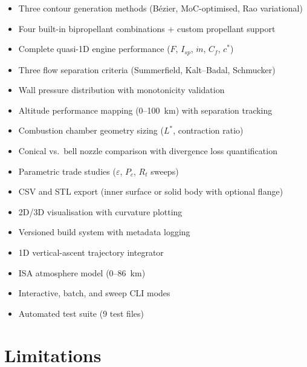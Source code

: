 \documentclass[11pt,a4paper]{article}
\begin{document}
\begin{itemize}[nosep]
\item Three contour generation methods (B\'ezier, MoC-optimised, Rao variational)
\item Four built-in bipropellant combinations + custom propellant support
\item Complete quasi-1D engine performance ($F$, $I_{sp}$, $\dot{m}$, $C_f$, $c^*$)
\item Three flow separation criteria (Summerfield, Kalt--Badal, Schmucker)
\item Wall pressure distribution with monotonicity validation
\item Altitude performance mapping (0--100~km) with separation tracking
\item Combustion chamber geometry sizing ($L^*$, contraction ratio)
\item Conical vs.\ bell nozzle comparison with divergence loss quantification
\item Parametric trade studies ($\varepsilon$, $P_c$, $R_t$ sweeps)
\item CSV and STL export (inner surface or solid body with optional flange)
\item 2D/3D visualisation with curvature plotting
\item Versioned build system with metadata logging
\item 1D vertical-ascent trajectory integrator
\item ISA atmosphere model (0--86~km)
\item Interactive, batch, and sweep CLI modes
\item Automated test suite (9 test files)
\end{itemize}

\section{Limitations}
\end{document}
